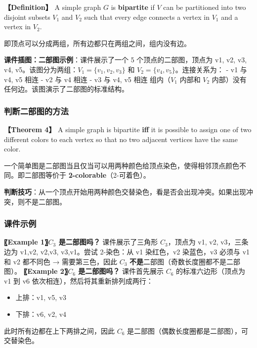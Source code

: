 \documentclass[10pt,a4paper,openany]{ctexbook}
\theoremstyle{definition}
\theoremstyle{remark}
\renewenvironment{quote}
  {\list{}{\leftmargin=1em\rightmargin=0pt\topsep=0.5pt\partopsep=0pt}\item[]}
  {\endlist}
\begin{document}
\textbf{【Definition】} A simple graph $G$ is \textbf{bipartite} if $V$ can be partitioned into two disjoint subsets $V_1$ and $V_2$ such that every edge connects a vertex in $V_1$ and a vertex in $V_2$.
\begin{quote}
即顶点可以分成两组，所有边都只在两组之间，组内没有边。

\textbf{课件插图：二部图示例}：课件展示了一个 5 个顶点的二部图，顶点为 v1, v2, v3, v4, v5。该图分为两组：$V_1 = \{v_1, v_2, v_3\}$ 和 $V_2 = \{v_4, v_5\}$。连接关系为：
- v1 与 v4, v5 相连
- v2 与 v4 相连
- v3 与 v4, v5 相连
组内（$V_1$ 内部和 $V_2$ 内部）没有任何边。该图演示了二部图的标准结构。

\end{quote}

\subsubsection{判断二部图的方法}

\textbf{【Theorem 4】} A simple graph is bipartite \textbf{iff} it is possible to assign one of two different colors to each vertex so that no two adjacent vertices have the same color.
\begin{quote}
一个简单图是二部图当且仅当可以用两种颜色给顶点染色，使得相邻顶点颜色不同。即二部图等价于 \textbf{2-colorable}（2-可着色）。

\textbf{判断技巧}：从一个顶点开始用两种颜色交替染色，看是否会出现冲突。如果出现冲突，则不是二部图。

\end{quote}

\subsubsection{课件示例}

\textbf{〖Example 1〗$C_3$ 是二部图吗？}
课件展示了三角形 $C_3$，顶点为 v1, v2, v3，三条边为 {v1,v2}, {v2,v3}, {v3,v1}。尝试 2-染色：从 v1 染红色，v2 染蓝色，v3 必须与 v1 和 v2 都不同色 → 需要第三色，因此 $C_3$ \textbf{不是}二部图（奇数长度圈都不是二部图）。
\textbf{〖Example 2〗$C_6$ 是二部图吗？}
课件首先展示 $C_6$ 的标准六边形（顶点为 v1 到 v6 依次相连），然后将其重新排列成两行：
\begin{itemize}
\item 上排：v1, v5, v3
\item 下排：v6, v2, v4
\end{itemize}

此时所有边都在上下两排之间，因此 $C_6$ 是二部图（偶数长度圈都是二部图），可交替染色。
\end{document}
